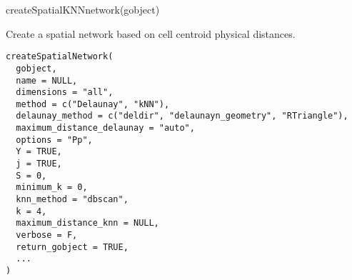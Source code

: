 \documentclass[a4paper]{book}
\begin{document}
%
\begin{Examples}
\begin{ExampleCode}
    createSpatialKNNnetwork(gobject)
\end{ExampleCode}
\end{Examples}
%
\begin{Description}\relax
Create a spatial network based on cell centroid physical distances.
\end{Description}
%
\begin{Usage}
\begin{verbatim}
createSpatialNetwork(
  gobject,
  name = NULL,
  dimensions = "all",
  method = c("Delaunay", "kNN"),
  delaunay_method = c("deldir", "delaunayn_geometry", "RTriangle"),
  maximum_distance_delaunay = "auto",
  options = "Pp",
  Y = TRUE,
  j = TRUE,
  S = 0,
  minimum_k = 0,
  knn_method = "dbscan",
  k = 4,
  maximum_distance_knn = NULL,
  verbose = F,
  return_gobject = TRUE,
  ...
)
\end{verbatim}
\end{Usage}
%
\end{document}
